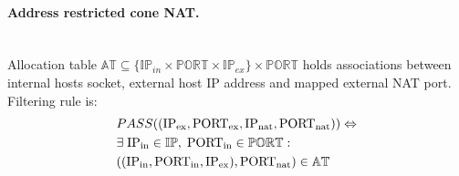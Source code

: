 \documentclass[twoside]{article}
\begin{document}
\begin{multicols}{2}
\paragraph{Address restricted cone NAT.} ~\\
Allocation table $\mathbb{AT} \subseteq \{\mathbb{IP}_{in} \times \mathbb{PORT} \times \mathbb{IP}_{ex}\} \times \mathbb{PORT}$ 
holds associations between internal hosts socket, external host IP address and mapped external NAT port. 
Filtering rule is:
\begin{align*}
& PASS((\text{IP\textsubscript{ex}}, \text{PORT\textsubscript{ex}}, \text{IP\textsubscript{nat}}, \text{PORT\textsubscript{nat}} )) \Leftrightarrow \\
&  \exists \; \text{IP\textsubscript{in}} \in \mathbb{IP}, \; \text{PORT\textsubscript{in}} \in \mathbb{PORT}:\\
& ((\text{IP\textsubscript{in}}, \text{PORT\textsubscript{in}}, \text{IP\textsubscript{ex}}), \text{PORT\textsubscript{nat}} ) \in \mathbb{AT}
\end{align*}

%



\end{multicols}
\end{document}
